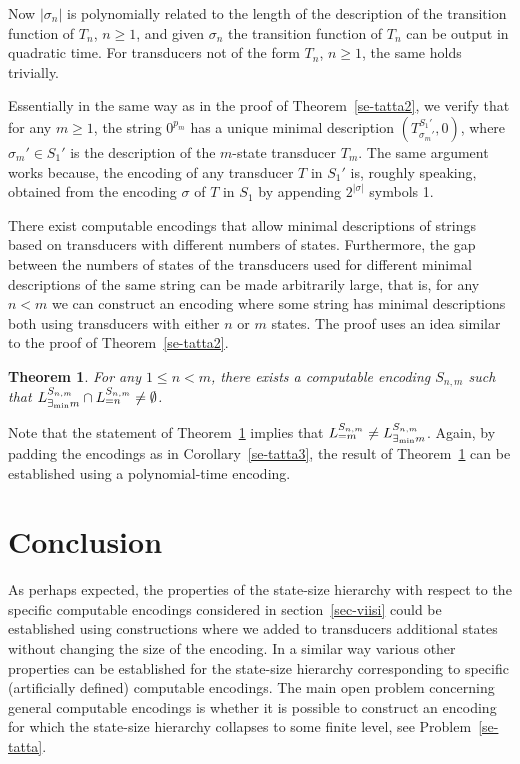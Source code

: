 \documentclass[copyright]{eptcs}
\def \prend{\vrule depth-1pt height7pt width6pt}
\def \endpf{{\ \ \prend \medbreak}}
\newtheorem{theorem}{T\/heorem}[section]
\begin{document}
Now $|\sigma_n|$ is polynomially related to the length of the description
of the transition function of $T_n$, $n \geq 1$, and given
$\sigma_n$ the transition function of $T_n$ can be output in quadratic time.
For transducers not of the form $T_n$, $n \geq 1$, the same holds trivially.

Essentially in the same way as in the proof of Theorem~\ref{se-tatta2},
we verify that for any $m \geq 1$, 
the string $0^{p_m}$ has a unique minimal
description $(T^{S_1'}_{\sigma_m'}, 0)$, where
$\sigma_m' \in S_1'$ is the description of the $m$-state
transducer $T_m$. The same argument works because, the encoding
of any transducer $T$ in $S_1'$ is, roughly speaking, obtained from
the encoding $\sigma$ of $T$ in $S_1$ by appending $2^{|\sigma|}$
symbols 1.
\endpf

There exist computable encodings that allow minimal descriptions of
strings based on transducers with different numbers of states.
Furthermore, the gap between the numbers of states of
the transducers used for different minimal descriptions
of the same string can be made arbitrarily
large, that is,
for any $n < m$ we can construct an encoding where
some string has  minimal descriptions both using
transducers with either $n$ or $m$ states. 
The proof  uses an idea
similar to the proof of Theorem~\ref{se-tatta2}.


\begin{theorem}
\label{se-tatta4}
For any $1 \leq n < m$, there exists a computable encoding
$S_{n, m}$ such that $L^{S_{n,m}}_{\exists_{\rm min} m} \cap L^{S_{n, m}}_{=n} 
\neq \emptyset$.
\end{theorem}

Note that the statement of Theorem~\ref{se-tatta4} implies that
$L^{S_{n, m}}_{=m} \neq L^{S_{n,m}}_{\exists_{\rm min} m}$.
Again, by padding the encodings as in Corollary~\ref{se-tatta3},
the result of Theorem~\ref{se-tatta4} can be established using
a polynomial-time encoding.

\section{Conclusion}

As perhaps expected, the properties of the state-size hierarchy
with respect to the specific  computable encodings considered
in section~\ref{sec-viisi} could be established
using constructions where we  added to transducers additional states
without changing the size of the encoding. 
In a similar way
various other properties can be established
for the state-size hierarchy corresponding 
to specific (artificially defined)
computable encodings. The main open problem concerning general
computable encodings is whether it is possible
to construct an encoding
for which the state-size hierarchy collapses
to some finite level, see Problem~\ref{se-tatta}.
\end{document}
